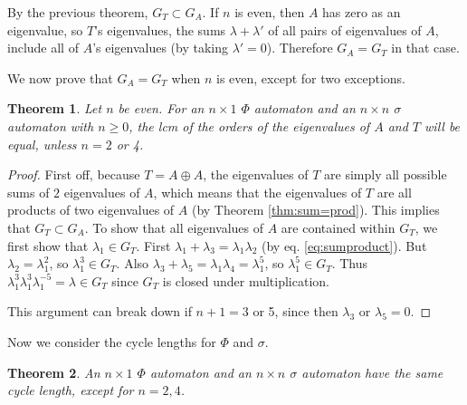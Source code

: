 \documentclass{elsarticle}
\newtheorem{thm}{Theorem}[section]
\theoremstyle{definition}
\begin{document}
By the previous theorem, $G_T\subset G_A$.
If $n$ is even, then $A$ has zero as an eigenvalue, so $T$'s eigenvalues, the sums $\lambda+\lambda'$ of all pairs of eigenvalues of $A$, include all of $A$'s eigenvalues (by taking $\lambda'=0$).
Therefore $G_A=G_T$ in that case.

We now prove that $G_A=G_T$ when $n$ is even, except for two exceptions.

\begin{thm}
Let $n$ be even. For an $n \times 1$ $\Phi$ automaton and an $n \times n$ $\sigma$ automaton with $n \geq 0$, the lcm of the orders of the eigenvalues of $A$ and $T$ will be equal, unless $n=2$ or 4.
\label{thm:eig_lcm_equal}
\end{thm}

\begin{proof}
\par First off, because $T = A \oplus A$, the eigenvalues of $T$ are simply all possible sums of $2$ eigenvalues of $A$, which means that the eigenvalues of $T$ are all products of two eigenvalues of $A$ (by Theorem \ref{thm:sum=prod}).
This implies that $G_T\subset G_A$.
To show that all eigenvalues of $A$ are contained within $G_T$, we first show that $\lambda_1\in G_T$.  First
 $\lambda_1+\lambda_3=\lambda_1\lambda_2$ (by eq. \ref{eq:sumproduct}).
 But $\lambda_2=\lambda_1^2$, so $\lambda_1^3\in G_T$.  Also $\lambda_3+\lambda_5=\lambda_1\lambda_4=\lambda_1^5$, so $\lambda_1^5\in G_T.$
 Thus $\lambda_1 ^ 3 \lambda_1 ^3 \lambda_1 ^ {-5} = \lambda \in G_T$ since $G_T$ is closed under multiplication. 

 This argument can break down if $n+1=3$ or 5, since then $\lambda_3$ or $\lambda_5=0$. 
 \end{proof}

Now we consider the cycle lengths for $\Phi$ and $\sigma$.
\begin{thm}
An $n \times 1$ $\Phi$ automaton and an $n \times n$ $\sigma$ automaton have the same cycle length, except for $n=2,4$.
\label{thm:CL_equal}
\end{thm}

\label{jb_period_1}
\end{document}
